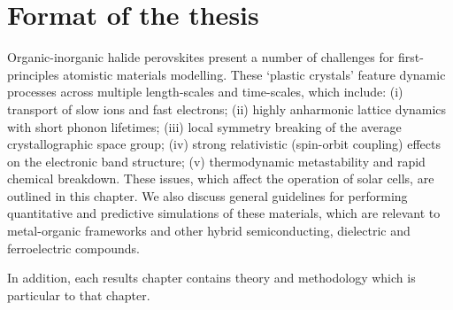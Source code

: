 
\section{Format of the thesis}

Organic-inorganic halide perovskites present a number of challenges for first-principles atomistic materials modelling. These `plastic crystals' feature dynamic processes across multiple length-scales and time-scales, which include:
(i) transport of slow ions and fast electrons;
(ii) highly anharmonic lattice dynamics with short phonon lifetimes;
(iii) local symmetry breaking of the average crystallographic space group;
(iv) strong relativistic (spin-orbit coupling) effects on the electronic band structure;
(v) thermodynamic metastability and rapid chemical breakdown.
These issues, which affect the operation of solar cells, are outlined in this chapter. 
We also discuss general guidelines for performing quantitative and predictive simulations
of these materials,
which are relevant to metal-organic frameworks and other hybrid semiconducting, dielectric and ferroelectric compounds.


In addition, each results chapter contains theory and methodology which is particular to that chapter.

